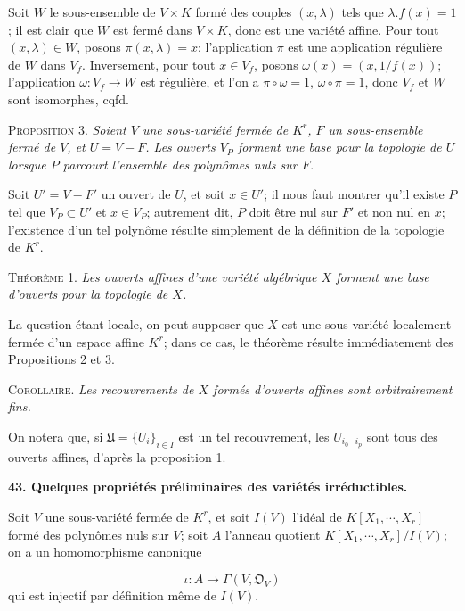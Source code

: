 Soit $W$ le sous-ensemble de $V \times K$ formé des couples $(x, \lambda)$ tels que $\lambda.f(x) = 1$; il est clair que $W$ est fermé dans $V \times K$, donc est une variété affine. Pour tout $(x, \lambda) \in W$, posons $\pi(x, \lambda) = x$; l'application $\pi$ est une application régulière de $W$ dans $V_f$. Inversement, pour tout $x \in V_f$, posons $\omega(x) = (x, 1/f(x))$; l'application $\omega : V_f \rightarrow W$ est régulière, et l'on a $\pi \circ \omega = 1$, $\omega \circ \pi = 1$, donc $V_f$ et $W$ sont isomorphes, cqfd.

\textsc{Proposition} 3. \textit{Soient $V$ une sous-variété fermée de $K^r$, $F$ un sous-ensemble fermé de $V$, et $U = V - F$. Les ouverts $V_P$ forment une base pour la topologie de $U$ lorsque $P$ parcourt l'ensemble des polynômes nuls sur $F$.}

Soit $U' = V - F'$ un ouvert de $U$, et soit $x \in U'$; il nous faut montrer qu'il existe $P$ tel que $V_P \subset U'$ et $x \in V_P$; autrement dit, $P$ doit être nul sur $F'$ et non nul en $x$; l'existence d'un tel polynôme résulte simplement de la définition de la topologie de $K^r$.

\textsc{Théorème} 1. \textit{Les ouverts affines d'une variété algébrique $X$ forment une base d'ouverts pour la topologie de $X$.}

La question étant locale, on peut supposer que $X$ est une sous-variété localement fermée d'un espace affine $K^r$; dans ce cas, le théorème résulte immédiatement des Propositions 2 et 3.

\textsc{Corollaire}. \textit{Les recouvrements de $X$ formés d'ouverts affines sont arbitrairement fins.}

On notera que, si $\mathfrak{U} = \{U_i\}_{i \in I}$ est un tel recouvrement, les $U_{i_0 \cdots i_p}$ sont tous des ouverts affines, d'après la proposition 1.


\textbf{43. Quelques propriétés préliminaires des variétés irréductibles.}

Soit $V$ une
sous-variété fermée de $K^r$, et soit $I(V)$ l'idéal de $K[X_1 , \cdots , X_r]$ formé des polynômes nuls sur $V$; soit $A$ l'anneau quotient $K[X_1 , \cdots , X_r]/I(V)$; on a un homomorphisme canonique

\begin{equation*}
\iota : A \to \Gamma(V, \mathfrak{O}_V)
\end{equation*}
qui est injectif par définition même de $I(V)$.

